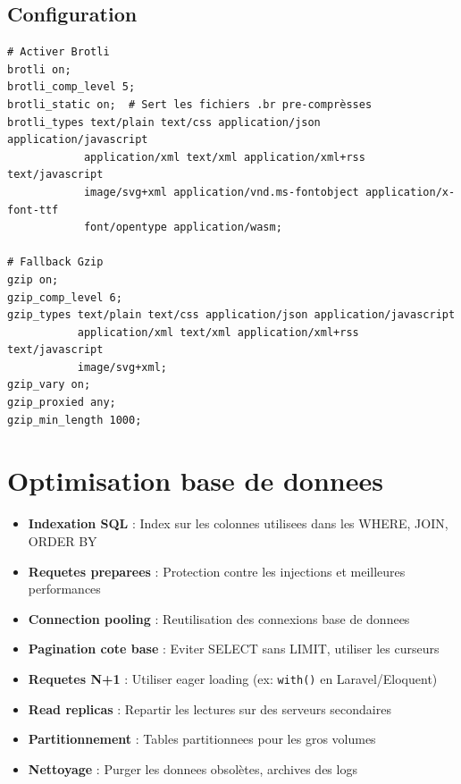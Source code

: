 \subsection{Configuration}

\begin{lstlisting}[style=code,caption={Configuration NGINX pour Brotli et Gzip}]
# Activer Brotli
brotli on;
brotli_comp_level 5;
brotli_static on;  # Sert les fichiers .br pre-comprèsses
brotli_types text/plain text/css application/json application/javascript
            application/xml text/xml application/xml+rss text/javascript
            image/svg+xml application/vnd.ms-fontobject application/x-font-ttf
            font/opentype application/wasm;

# Fallback Gzip
gzip on;
gzip_comp_level 6;
gzip_types text/plain text/css application/json application/javascript
           application/xml text/xml application/xml+rss text/javascript
           image/svg+xml;
gzip_vary on;
gzip_proxied any;
gzip_min_length 1000;
\end{lstlisting}


\section{Optimisation base de donnees}

\begin{itemize}
    \item \textbf{Indexation SQL} : Index sur les colonnes utilisees dans les WHERE, JOIN, ORDER BY
    \item \textbf{Requetes preparees} : Protection contre les injections et meilleures performances
    \item \textbf{Connection pooling} : Reutilisation des connexions base de donnees
    \item \textbf{Pagination cote base} : Eviter SELECT sans LIMIT, utiliser les curseurs
    \item \textbf{Requetes N+1} : Utiliser eager loading (ex: \texttt{with()} en Laravel/Eloquent)
    \item \textbf{Read replicas} : Repartir les lectures sur des serveurs secondaires
    \item \textbf{Partitionnement} : Tables partitionnees pour les gros volumes
    \item \textbf{Nettoyage} : Purger les donnees obsolètes, archives des logs
\end{itemize}

